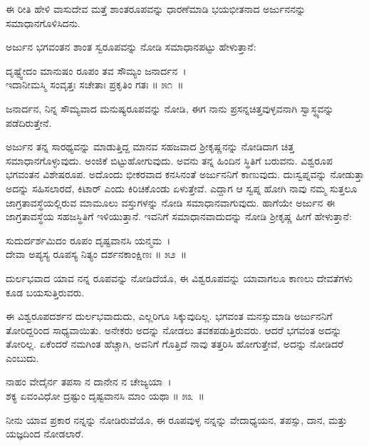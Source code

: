 \begin{artha}
ಈ ರೀತಿ ಹೇಳಿ ವಾಸುದೇವ ಮತ್ತೆ ಶಾಂತರೂಪವನ್ನು ಧಾರಣೆಮಾಡಿ ಭಯಭೀತನಾದ ಅರ್ಜುನನನ್ನು ಸಮಾಧಾನಗೊಳಿಸಿದನು.
\end{artha}

ಅರ್ಜುನ ಭಗವಂತನ ಶಾಂತ ಸ್ವರೂಪವನ್ನು ನೋಡಿ ಸಮಾಧಾನಪಟ್ಟು ಹೇಳುತ್ತಾನೆ:

\begin{shloka}
ದೃಷ್ಟ್ವೇದಂ ಮಾನುಷಂ ರೂಪಂ ತವ ಸೌಮ್ಯಂ ಜನಾರ್ದನ~।\\ಇದಾನೀಮಸ್ಮಿ ಸಂವೃತ್ತಃ ಸಚೇತಾಃ ಪ್ರಕೃತಿಂ ಗತಃ \hfill॥ ೫೧~॥
\end{shloka}

\begin{artha}
ಜನಾರ್ದನ, ನಿನ್ನ ಸೌಮ್ಯವಾದ ಮನುಷ್ಯರೂಪವನ್ನು ನೋಡಿ, ಈಗ ನಾನು ಪ್ರಸನ್ನಚಿತ್ತವುಳ್ಳವನಾಗಿ ಸ್ವಾಸ್ಥ್ಯವನ್ನು ಪಡೆದಿರುತ್ತೇನೆ.
\end{artha}

ಅರ್ಜುನ ತನ್ನ ಸಾರಥ್ಯವನ್ನು ಮಾಡುತ್ತಿದ್ದ ಮಾನವ ಸಹಜವಾದ ಶ‍್ರೀಕೃಷ್ಣನನ್ನು ನೋಡಿದಾಗ ಚಿತ್ತ ಸಮಾಧಾನಗೊಳ್ಳುವುದು. ಅಂಜಿಕೆ ಬಿಟ್ಟುಹೋಗುವುದು. ಅವನು ತನ್ನ ಹಿಂದಿನ ಸ್ಥಿತಿಗೆ ಬರುವನು. ವಿಶ್ವರೂಪ ಭಗವಂತನ ವಿಶೇಷರೂಪ. ಅದೊಂದು ಭೀಕರವಾದ ಕನಸಿನಂತೆ ಅರ್ಜುನನಿಗೆ ಕಾಣುವುದು. ದುಃಸ್ವಪ್ನವನ್ನು ನೋಡುತ್ತಾ ಅದನ್ನು ಸಹಿಸಲಾರದೆ, ಕಿಟಾರ್ ಎಂದು ಕಿರಿಚಿಕೊಂಡು ಏಳುತ್ತೇವೆ. ಎದ್ದಾಗ ಆ ಸ್ವಪ್ನ ಹೋಗಿ ನಾವು ನಮ್ಮ ಸುತ್ತಲೂ ಜಾಗ್ರತಾವಸ್ಥೆಯಲ್ಲಿ\-ರುವ ಮಾಮೂಲು ವಸ್ತುಗಳನ್ನು ನೋಡಿ ಸಮಾಧಾನವಾಗುವುದು. ಹಾಗೆಯೇ ಅರ್ಜುನ ಈ ಜಾಗ್ರತಾವಸ್ಥೆಯ ಸಹಜಸ್ಥಿತಿಗೆ ಇಳಿಯುತ್ತಾನೆ. ಇವನಿಗೆ ಸಮಾಧಾನವಾದುದನ್ನು ನೋಡಿ ಶ‍್ರೀಕೃಷ್ಣ ಹೀಗೆ ಹೇಳುತ್ತಾನೆ:

\begin{shloka}
ಸುದುರ್ದರ್ಶಮಿದಂ ರೂಪಂ ದೃಷ್ಟವಾನಸಿ ಯನ್ಮಮ~।\\ದೇವಾ ಅಪ್ಯಸ್ಯ ರೂಪಸ್ಯ ನಿತ್ಯಂ ದರ್ಶನಕಾಂಕ್ಷಿಣಃ \hfill॥ ೫೨~॥
\end{shloka}

\begin{artha}
ದುರ್ಲಭವಾದ ಯಾವ ನನ್ನ ರೂಪವನ್ನು ನೋಡಿದೆಯೊ, ಈ ವಿಶ್ವರೂಪವನ್ನು ಯಾವಾಗಲೂ ಕಾಣಲು ದೇವತೆಗಳು ಕೂಡ ಬಯಸುತ್ತಿರುವರು.
\end{artha}

ಈ ವಿಶ್ವರೂಪದರ್ಶನ ದುರ್ಲಭವಾದುದು, ಎಲ್ಲರಿಗೂ ಸಿಕ್ಕುವುದಿಲ್ಲ. ಭಗವಂತ ಮನಸ್ಸು\-ಮಾಡಿ ಅರ್ಜುನನಿಗೆ ತೋರಿದ್ದರಿಂದ ಸಾಧ್ಯವಾಯಿತು. ಅನೇಕರು ಅದನ್ನು ನೋಡಲು ತವಕ\-ಪಡುತ್ತಿರುವರು. ಆದರೆ ಭಗವಂತ ಅದನ್ನು ತೋರಿಲ್ಲ. ಏಕೆಂದರೆ ನಮಗಿಂತ ಹೆಚ್ಚಾಗಿ, ಅವನಿಗೆ ಗೊತ್ತಿದೆ ನಾವು ತತ್ತರಿಸಿ ಹೋಗುತ್ತೇವೆ, ಅದನ್ನು ನೋಡಿದರೆ ಎಂಬುದು.

\begin{shloka}
ನಾಹಂ ವೇದೈರ್ನ ತಪಸಾ ನ ದಾನೇನ ನ ಚೇಜ್ಯಯಾ~।\\ಶಕ್ಯ ಏವಂವಿಧೋ ದ್ರಷ್ಟುಂ ದೃಷ್ಟವಾನಸಿ ಮಾಂ ಯಥಾ \hfill॥ ೫೩~॥
\end{shloka}

\begin{artha}
ನೀನು ಯಾವ ಪ್ರಕಾರ ನನ್ನನ್ನು ನೋಡಿರುವೆಯೊ, ಈ ರೂಪವುಳ್ಳ ನನ್ನನ್ನು ವೇದಾಧ್ಯಯನ, ತಪಸ್ಸು, ದಾನ, ಮತ್ತು ಯಜ್ಞದಿಂದ ನೋಡಲಾರೆ.
\end{artha}

